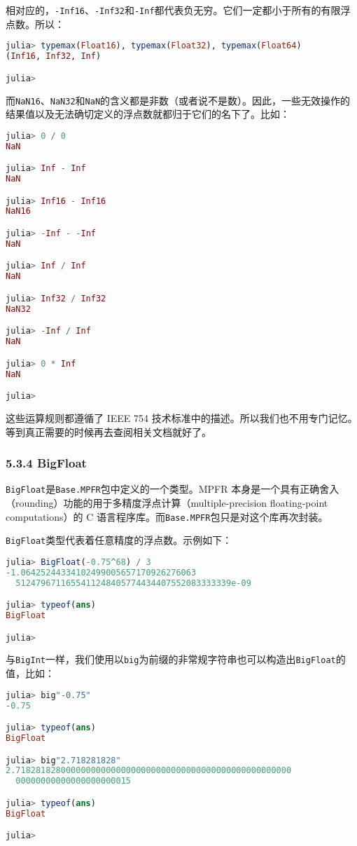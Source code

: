相对应的，\verb|-Inf16|、\verb|-Inf32|和\verb|-Inf|都代表负无穷。它们一定都小于所有的有限浮点数。所以：
\begin{lstlisting}[language=julia]
julia> typemax(Float16), typemax(Float32), typemax(Float64)
(Inf16, Inf32, Inf)

julia> 
\end{lstlisting}

而\verb|NaN16|、\verb|NaN32|和\verb|NaN|的含义都是非数（或者说不是数）。因此，一些无效操作的结果值以及无法确切定义的浮点数就都归于它们的名下了。比如：
\begin{lstlisting}[language=julia]
julia> 0 / 0
NaN

julia> Inf - Inf
NaN

julia> Inf16 - Inf16
NaN16

julia> -Inf - -Inf
NaN

julia> Inf / Inf
NaN

julia> Inf32 / Inf32
NaN32

julia> -Inf / Inf
NaN

julia> 0 * Inf
NaN

julia> 
\end{lstlisting}

这些运算规则都遵循了 IEEE 754 技术标准中的描述。所以我们也不用专门记忆。等到真正需要的时候再去查阅相关文档就好了。

\subsubsection{5.3.4 BigFloat}

\verb|BigFloat|是\verb|Base.MPFR|包中定义的一个类型。MPFR 本身是一个具有正确舍入（rounding）功能的用于多精度浮点计算（multiple-precision floating-point computations）的 C 语言程序库。而\verb|Base.MPFR|包只是对这个库再次封装。

\verb|BigFloat|类型代表着任意精度的浮点数。示例如下：
\begin{lstlisting}[language=julia]
julia> BigFloat(-0.75^68) / 3
-1.06425244334102499005657170926276063
  5124796711655411248405774434407552083333339e-09

julia> typeof(ans)
BigFloat

julia> 
\end{lstlisting}

与\verb|BigInt|一样，我们使用以\verb|big|为前缀的非常规字符串也可以构造出\verb|BigFloat|的值，比如：
\begin{lstlisting}[language=julia]
julia> big"-0.75"
-0.75

julia> typeof(ans)
BigFloat

julia> big"2.718281828"
2.7182818280000000000000000000000000000000000000000000000
  00000000000000000000015

julia> typeof(ans)
BigFloat

julia> 
\end{lstlisting}

